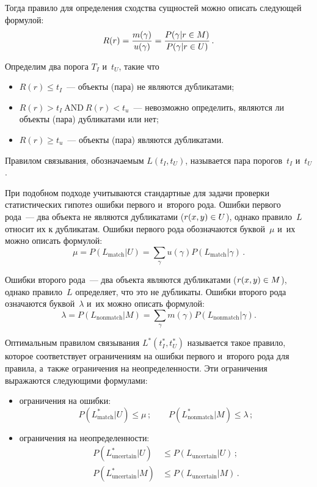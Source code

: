 \begin{multicols}{2}
  Тогда правило для определения сходства сущностей можно описать следующей
формулой:
  $$
  R(r)= \displaystyle\frac{\displaystyle m(\gamma)\mathstrut}{\displaystyle u(\gamma)\mathstrut} = \displaystyle\frac{\displaystyle P(\gamma\vert r\in M)\mathstrut}{\displaystyle P(\gamma \vert r\in U)\mathstrut}\,.
  $$


  Определим два порога $T_I$ и~$t_U$, такие что
  \begin{itemize}
  \item $R(r)\leq t_I$~--- объекты (пара) не являются дубликатами;\\[-13pt]
\item $R(r)>t_I\ \mathrm{AND}\ R(r)<t_u$~--- невозможно определить, являются ли объекты (пара)
дубликатами или нет;
\item $R(r)\geq t_u$~--- объекты (пара) являются дубликатами.
\end{itemize}

  Правилом связывания, обозначаемым $L(t_I,t_U)$, называется пара порогов~$t_I$
и~$t_U$.

  При подобном подходе учитываются стандартные для задачи проверки статистических
гипотез ошибки первого и~второго рода. Ошибки первого рода~--- два объекта не являются
дубликатами ($r(x,y)\hm\in U$), однако правило~$L$ относит их к дуб\-ли\-ка\-там. Ошибки
первого рода обозначаются бук\-вой~$\mu$ и~их можно описать формулой:
  $$
  \mu= P(L_{\mathrm{match}}\vert U) =\sum\limits_\gamma u(\gamma) P\left(L_{\mathrm{match}}\vert
\gamma\right)\,.
  $$

  Ошибки второго рода~--- два объекта являются дубликатами ($r(x,y)\hm\in M$), однако
правило~$L$ определяет, что это не дубликаты. Ошибки второго рода означаются
буквой~$\lambda$ и~их можно описать формулой:
  $$
  \lambda= P(L_{\mathrm{nonmatch}}\vert M) =
  \sum\limits_\gamma m(\gamma) P\left(
L_{\mathrm{nonmatch}} \vert \gamma\right).
  $$

  Оптимальным правилом связывания $L^*(t_I^*,t_U^*)$ называется такое правило,
которое соответствует ограничениям на ошибки первого и~второго рода для правила,
  а~так\-же ограничения на неопределенности. Эти ограничения выражаются следующими
формулами:
\begin{itemize}
\item
  ограничения на ошибки:
  $$
  P\left( L^*_{\mathrm{match}}\vert U\right) \leq \mu\,;\qquad
  P\left( L^*_{\mathrm{nonmatch}}\vert M\right) \leq
\lambda\,;
  $$
\item
  ограничения на неопределенности:
  \begin{align*}
  P\left( L^*_{\mathrm{uncertain}}\vert U\right) &\leq P\left( L_{\mathrm{uncertain}} \vert U\right)\,;\\
  P\left( L^*_{\mathrm{uncertain}} \vert M\right)&\leq P\left( L_{\mathrm{uncertain}}\vert M\right)\,.
\end{align*}
\end{itemize}


\end{multicols}
